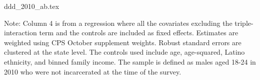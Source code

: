 \documentclass{article}
\begin{document}
\clearpage

{ddd_2010_ab.tex}
\begin{footnotesize}
  \noindent Note: Column 4 is from a regression where all the covariates excluding the triple-interaction term and the controls are included as fixed effects. Estimates are weighted using CPS October supplement weights. Robust standard errors are clustered at the state level. The controls used include age, age-squared, Latino ethnicity, and binned family income. The sample is defined as males aged 18-24 in 2010 who were not incarcerated at the time of the survey. 
\end{footnotesize}

\clearpage
\end{document}
